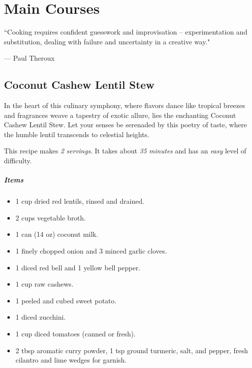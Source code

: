\chapter{Main Courses}
\label{mains}
\epigraph{``Cooking requires confident guesswork and improvisation -- experimentation and substitution, dealing with failure and uncertainty in a creative way."}{--- \textup{Paul Theroux}}

\section{Coconut Cashew Lentil Stew}
\label{coconutcashewlentilstew}
In the heart of this culinary symphony, where flavors dance like tropical breezes and fragrances weave a tapestry of exotic allure, lies the enchanting Coconut Cashew Lentil Stew. Let your senses be serenaded by this poetry of taste, where the humble lentil transcends to celestial heights.

This recipe makes \emph{2 servings}. It takes about \emph{35 minutes} and has an \emph{easy} level of difficulty. 

\paragraph{Items}
\begin{itemize}[noitemsep]
	\item[\ding{182}] 1 cup dried red lentils, rinsed and drained.
	\item[\ding{183}] 2 cups vegetable broth.
	\item[\ding{184}] 1 can (14 oz) coconut milk.
	\item[\ding{185}] 1 finely chopped onion and 3 minced garlic cloves.
	\item[\ding{186}] 1 diced red bell and 1 yellow bell pepper.
	\item[\ding{187}] 1 cup raw cashews.
	\item[\ding{188}] 1 peeled and cubed sweet potato.
	\item[\ding{189}] 1 diced zucchini.
	\item[\ding{190}] 1 cup diced tomatoes (canned or fresh).
	\item[\ding{191}] 2 tbsp aromatic curry powder, 1 tsp ground turmeric, salt, and pepper, fresh cilantro and lime wedges for garnish.
\end{itemize}

